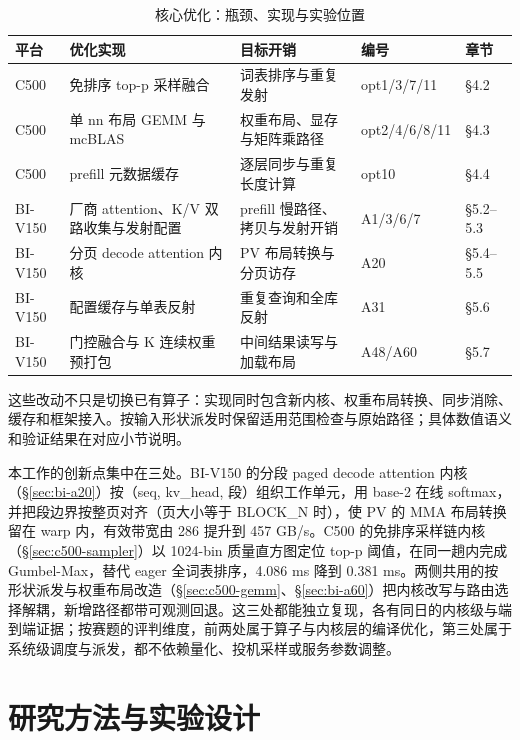 \documentclass[11pt,a4paper]{ctexart}
\newcommand{\secref}[1]{\S\ref{#1}}
\begin{document}
\begin{table}[!htbp]
\centering\small
\caption{核心优化：瓶颈、实现与实验位置\label{tab:contributions}}
\begin{tabularx}{\linewidth}{@{}>{\raggedright\arraybackslash}p{1.35cm} Y >{\raggedright\arraybackslash}p{4.4cm} >{\raggedright\arraybackslash}p{1.95cm} >{\raggedright\arraybackslash}p{1.5cm}@{}}
\toprule
平台 & 优化实现 & 目标开销 & 编号 & 章节 \\
\midrule
C500 & 免排序 top-p 采样融合 & 词表排序与重复发射 & opt1/3/7/11 & \S4.2 \\
C500 & 单 nn 布局 GEMM 与 mcBLAS & 权重布局、显存与矩阵乘路径 & opt2/4/6/8/11 & \S4.3 \\
C500 & prefill 元数据缓存 & 逐层同步与重复长度计算 & opt10 & \S4.4 \\
\midrule
BI-V150 & 厂商 attention、K/V 双路收集与发射配置 & prefill 慢路径、拷贝与发射开销 & A1/3/6/7 & \S5.2--5.3 \\
BI-V150 & 分页 decode attention 内核 & PV 布局转换与分页访存 & A20 & \S5.4--5.5 \\
BI-V150 & 配置缓存与单表反射 & 重复查询和全库反射 & A31 & \S5.6 \\
BI-V150 & 门控融合与 K 连续权重预打包 & 中间结果读写与加载布局 & A48/A60 & \S5.7 \\
\bottomrule
\end{tabularx}
\end{table}

这些改动不只是切换已有算子：实现同时包含新内核、权重布局转换、同步消除、缓存和框架接入。按输入形状派发时保留适用范围检查与原始路径；具体数值语义和验证结果在对应小节说明。

本工作的创新点集中在三处。BI-V150 的分段 paged decode attention 内核（\secref{sec:bi-a20}）按（seq, kv\_head, 段）组织工作单元，用 base-2 在线 softmax，并把段边界按整页对齐（页大小等于 BLOCK\_N 时），使 PV 的 MMA 布局转换留在 warp 内，有效带宽由 286 提升到 457 GB/s。C500 的免排序采样链内核（\secref{sec:c500-sampler}）以 1024-bin 质量直方图定位 top-p 阈值，在同一趟内完成 Gumbel-Max，替代 eager 全词表排序，4.086 ms 降到 0.381 ms。两侧共用的按形状派发与权重布局改造（\secref{sec:c500-gemm}、\secref{sec:bi-a60}）把内核改写与路由选择解耦，新增路径都带可观测回退。这三处都能独立复现，各有同日的内核级与端到端证据；按赛题的评判维度，前两处属于算子与内核层的编译优化，第三处属于系统级调度与派发，都不依赖量化、投机采样或服务参数调整。

\section{研究方法与实验设计}\label{sec:method}
\end{document}
